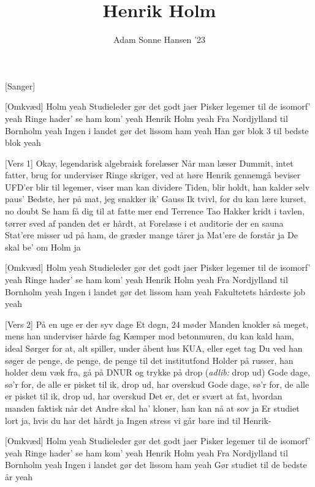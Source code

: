 \documentclass[a4paper,11pt]{article}
\title{Henrik Holm}
\author{Adam Sonne Hansen '23}
\begin{document}
\maketitle

\begin{roles}
[Sanger]
\end{roles}
\begin{song}
  \sings{}[Omkvæd]
Holm yeah
Studieleder gør det godt jaer
Pisker legemer til de isomorf' yeah
Ringe hader' se ham kom' yeah
Henrik Holm yeah
Fra Nordjylland til Bornholm yeah
Ingen i landet gør det lissom ham yeah
Han gør blok 3 til bedste blok yeah

\sings{}[Vers 1]
Okay, legendarisk algebraisk forelæser
Når man læser Dummit, intet fatter, brug for underviser
Ringe skriger, ved at høre Henrik gennemgå beviser
UFD'er blir til legemer, viser man kan dividere
Tiden, blir holdt, han kalder selv paus'
Bedste, her på mat, jeg snakker ik' Gauss
Ik tvivl, for du kan lære kurset, no doubt
Se ham få dig til at fatte mer end Terrence Tao
Hakker kridt i tavlen, tørrer sved af panden det er hårdt, at
Forelæse i et auditorie der en sauna
Stat'ere misser ud på ham, de græder mange tårer ja
Mat'ere de forstår ja
De skal be' om Holm ja

\sings{}[Omkvæd]
Holm yeah
Studieleder gør det godt jaer
Pisker legemer til de isomorf' yeah
Ringe hader' se ham kom' yeah
Henrik Holm yeah
Fra Nordjylland til Bornholm yeah
Ingen i landet gør det lissom ham yeah
Fakultetets hårdeste job yeah

\sings{}[Vers 2]
På en uge er der syv dage
Et døgn, 24 møder
Manden knokler så meget, mens han underviser hårde fag
Kæmper mod betonmuren, du kan kald ham, ideal
Sørger for at, alt spiller, under åbent hus KUA, eller eget tag
Du ved han søger de penge, de penge, de penge til det institutfond
Holder på russer, han holder dem væk fra, gå på DNUR og trykke på drop (\textit{adlib:} drop ud)  
Gode dage, sø'r for, de alle er pisket til ik, drop ud, har overskud
Gode dage, sø'r for, de alle er pisket til ik, drop ud, har overskud
Det er, det er svært at fat, hvordan  manden faktisk når det
Andre skal ha' kloner, han kan nå at sov ja
Er studiet lort ja, hvis du har det hårdt ja 
Ingen stress vi går bare ind til Henrik-

\sings{}[Omkvæd]
Holm yeah
Studieleder gør det godt jaer
Pisker legemer til de isomorf' yeah
Ringe hader' se ham kom' yeah
Henrik Holm yeah
Fra Nordjylland til Bornholm yeah
Ingen i landet gør det lissom ham yeah
Gør studiet til de bedste år yeah
\end{song}
\end{document}
